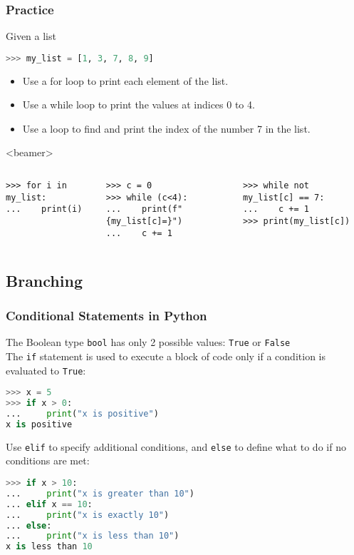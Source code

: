 \begin{frame}[fragile]
  \frametitle{Practice}
  Given a list
  \begin{lstlisting}[language=Python,numbers=none]
>>> my_list = [1, 3, 7, 8, 9] 
  \end{lstlisting}
 
 \begin{itemize}
  \item Use a for loop to print each element of the list.\pause
  \item Use a while loop to print the values at indices 0 to 4.\pause
  \item Use a loop to find and print the index of the number 7 in the list.
 \end{itemize}
 \begin{onlyenv}<beamer>
  \begin{columns}[T]
      \begin{lstlisting}[]
>>> for i in my_list:
...    print(i)
      \end{lstlisting}
      \begin{lstlisting}[]
>>> c = 0
>>> while (c<4):
...    print(f"{my_list[c]=}")
...    c += 1
      \end{lstlisting}
      \begin{lstlisting}[]
>>> while not my_list[c] == 7:
...    c += 1
>>> print(my_list[c])
      \end{lstlisting}      
  \end{columns}
 \end{onlyenv}
\end{frame}

\subsection{Branching}
\begin{frame}[fragile]
  \frametitle{Conditional Statements in Python}
  The Boolean type \lstinline|bool| has only 2 possible values: \lstinline|True| or \lstinline|False| \\
  The \lstinline{if} statement is used to execute a block of code only if a condition is evaluated to \lstinline|True|:
  \begin{lstlisting}[language=Python, numbers=none, deletekeywords={is,not}]
>>> x = 5
>>> if x > 0:
...     print("x is positive")
x is positive
  \end{lstlisting}\pause
  Use \lstinline{elif} to specify additional conditions, and \lstinline{else} to define what to do if no conditions are met:
  \begin{lstlisting}[language=Python, numbers=none, deletekeywords={is,not}]
>>> if x > 10:
...     print("x is greater than 10")
... elif x == 10:
...     print("x is exactly 10")
... else:
...     print("x is less than 10")
x is less than 10
  \end{lstlisting}
\end{frame}

